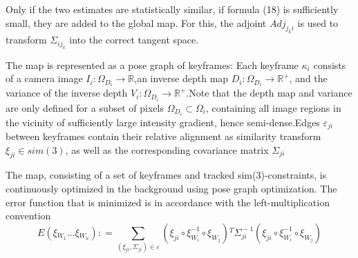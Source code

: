 Only if the two estimates are statistically similar, if formula (18) is sufficiently small, they are added to the global map. For this, the adjoint $Ad{j_{{j_k}i}}$ is used to transform ${\Sigma _{i{j_k}}}$ into the correct tangent space.

The map is represented as a pose graph of keyframes: Each keyframe $\kappa_{i}$ consists of a camera image $I_{i}\!:\!\Omega_{D_{i}}\!\rightarrow \!{\mathbb{R}}$,an inverse depth map $D_{i}\!:\!\Omega_{D_{i}}\!\rightarrow \!{\mathbb{R}}^{+}$, and the variance of the inverse depth $ V_{i}\!:\!\Omega_{D_{i}}\!\rightarrow \!{\mathbb{R}}^{+}$.Note that the depth map and variance are only defined for a subset of pixels $ \Omega_{D_{i}}\!\subset\!\Omega_{i} $, containing all image regions in the vicinity of sufficiently large intensity gradient, hence semi-dense.Edges $ \varepsilon_{ji}$ between keyframes contain their relative alignment as similarity transform $ \xi_{ji}\in sim(3) $, as well as the corresponding covariance matrix $\Sigma_{ji} $

The map, consisting of a set of keyframes and tracked sim(3)-constraints, is continuously optimized in the background using pose graph optimization. The
error function that is minimized is in accordance with the left-multiplication convention
\begin{equation}
E(\xi\!_{W\!_{1}}\!...\!\xi\!_{W\!_{n}})\!:\!= \sum\limits_{(\!\xi\!_{ji},\Sigma\!_{ji}\!)\!\in\!\varepsilon}\!(\!\xi_{ji}\!\circ\!\xi_{\!W_{i}\!}^{-1}\! \!\circ\!\xi_{\!W\!_{j}}\!)\!^{T}\!\Sigma_{\!j\!i}^{\!-1\!}\!(\!\xi_{ji}\!\circ\!\xi_{\!W_{i}\!}^{-1}\! \!\circ\!\xi_{\!W\!_{j}}\!)
\end{equation}
\fi
